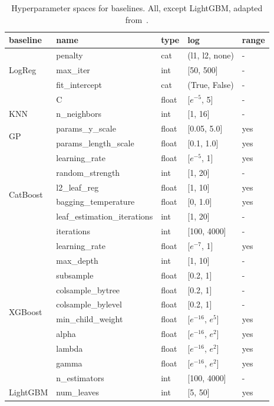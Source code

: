 \documentclass{article}
\begin{document}
\begin{table}[htbp]
\caption{Hyperparameter spaces for baselines. All, except LightGBM, adapted from~\citet{nnsfortabular2}.}
\label{app:tab:spaces}
\centering
\begin{tabular}{lllll}
\toprule
baseline &  name & type & log & range \\
\midrule
\multirow{3}{*}{LogReg} & penalty & cat & (l1, l2, none) & - \\
    & max\_iter & int & [50, 500] & - \\
    & fit\_intercept & cat & (True, False) & - \\
    & C & float & [$e^{-5}$, 5] & - \\
\midrule
\multirow{1}{*}{KNN} & n\_neighbors & int & [1, 16] & - \\
\midrule
\multirow{2}{*}{GP} & params\_y\_scale & float & [0.05, 5.0] & yes \\
    & params\_length\_scale & float & [0.1, 1.0] & yes \\
\midrule
\multirow{6}{*}{CatBoost} & learning\_rate & float & [$e^{-5}$, 1] & yes \\
    & random\_strength & int & [1, 20] & - \\
    & l2\_leaf\_reg & float & [1, 10] & yes \\
    & bagging\_temperature & float & [0, 1.0] & yes \\
    & leaf\_estimation\_iterations & int & [1, 20] & - \\
    & iterations & int & [100, 4000] & - \\
\midrule
\multirow{10}{*}{XGBoost} & learning\_rate & float & [$e^{-7}$, 1] & yes \\
    & max\_depth & int & [1, 10] & - \\
    & subsample & float & [0.2, 1] & - \\
    & colsample\_bytree & float & [0.2, 1] & - \\
    & colsample\_bylevel & float & [0.2, 1] & - \\
    & min\_child\_weight & float & [$e^{-16}$, $e^5$] & yes \\
    & alpha & float & [$e^{-16}$, $e^2$] & yes \\
    & lambda & float & [$e^{-16}$, $e^2$] & yes \\
    & gamma & float & [$e^{-16}$, $e^2$] & yes \\
    & n\_estimators & int & [100, 4000] & - \\
\midrule
\multirow{10}{*}{LightGBM} & num\_leaves & int & [5, 50] & yes \\

\end{tabular}
\end{table}
\end{document}
